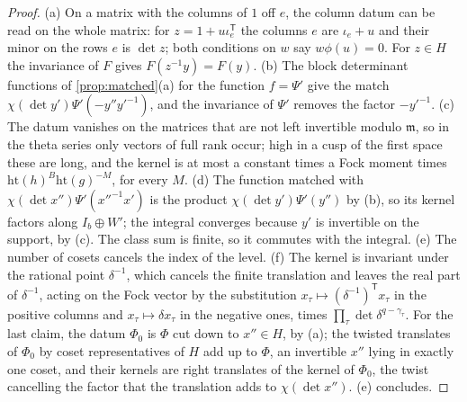 \begin{proof}
(a) On a matrix with the columns of $1$ off $e$, the column datum can be read on the whole matrix: for $z=1+u\iota_e^{\mathsf T}$ the columns $e$ are $\iota_e+u$ and their minor on the rows $e$ is $\det z$; both conditions on $w$ say
$w\phi(u)=0$. For $z\in H$ the invariance of $F$ gives $F(z^{-1}y)=F(y)$. (b) The block determinant functions of \cref{prop:matched}(a) for the function $f=\Psi'$ give the match $\chi(\det y')\Psi'(-y''y'^{-1})$, and the invariance of $\Psi'$ removes
the factor $-y'^{-1}$. (c) The datum vanishes on the matrices that are not left invertible modulo $\mathfrak m$, so in the theta series only vectors of full rank occur; high in a cusp of the first space these
are long, and the kernel is at most a constant times a Fock moment times $\mathrm{ht}(h)^B\mathrm{ht}(g)^{-M}$, for every $M$. (d) The function matched with
$\chi(\det x'')\Psi'(x''^{-1}x')$ is the product $\chi(\det y')\Psi'(y'')$ by (b), so its kernel factors along $I_b\oplus W'$; the integral converges because $y'$ is invertible on the support, by (c). The class sum is finite, so it commutes
with the integral. (e) The number of cosets cancels the index of the level. (f) The kernel is invariant under the rational point $\delta^{-1}$, which cancels the finite translation and leaves the real part of $\delta^{-1}$, acting on the
Fock vector by the substitution $x_\tau\mapsto(\delta^{-1})^{\mathsf T}x_\tau$ in the positive columns and $x_\tau\mapsto\delta x_\tau$ in the negative ones, times $\prod_\tau\det\delta^{q-\gamma_\tau}$. For the last claim, the datum $\Phi_0$ is $\Phi$ cut down to
$x''\in H$, by (a); the twisted translates of $\Phi_0$ by coset representatives of $H$ add up to $\Phi$, an invertible $x''$ lying in exactly one coset, and their kernels are right translates of the kernel of $\Phi_0$, the twist cancelling the
factor that the translation adds to $\chi(\det x'')$. (e) concludes.
\end{proof}

